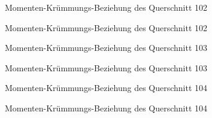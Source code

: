 \documentclass[
  11pt,
  letterpaper,
]{scrreprt}
\begin{document}
\begin{figure}[H]


\caption{\label{fig-qs_102}Momenten-Krümmungs-Beziehung des Querschnitt
102}

\end{figure}%

\begin{figure}[H]


\caption{\label{fig-m_chi_102}Momenten-Krümmungs-Beziehung des
Querschnitt 102}

\end{figure}%

\begin{figure}[H]


\caption{\label{fig-qs_103}Momenten-Krümmungs-Beziehung des Querschnitt
103}

\end{figure}%

\begin{figure}[H]


\caption{\label{fig-m_chi_103}Momenten-Krümmungs-Beziehung des
Querschnitt 103}

\end{figure}%

\begin{figure}[H]


\caption{\label{fig-qs_104}Momenten-Krümmungs-Beziehung des Querschnitt
104}

\end{figure}%

\begin{figure}[H]


\caption{\label{fig-m_chi_104}Momenten-Krümmungs-Beziehung des
Querschnitt 104}

\end{figure}%
\end{document}
